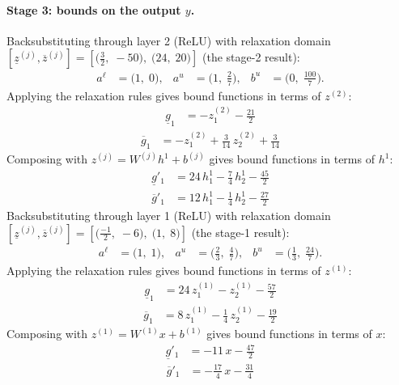 \documentclass[11pt]{article}
\begin{document}
\paragraph{Stage 3: bounds on the output $y$.}
Backsubstituting through layer 2 (ReLU) with relaxation domain $[\underline{z}^{(j)}, \overline{z}^{(j)}] = [\bigl(\frac{3}{2},\; -50\bigr),\; \bigl(24,\; 20\bigr)]$ (the stage-2 result):
\begin{align*}
a^{\ell} &= \bigl(1,\; 0\bigr), & a^{u} &= \bigl(1,\; \frac{2}{7}\bigr), & b^{u} &= \bigl(0,\; \frac{100}{7}\bigr).
\end{align*}
Applying the relaxation rules gives bound functions in terms of $z^{(2)}$:
\begin{align*}
\underline{g}_{1} &= -z^{(2)}_{1} - \frac{21}{2}
\end{align*}
\begin{align*}
\overline{g}_{1} &= -z^{(2)}_{1} + \frac{3}{14}\,z^{(2)}_{2} + \frac{3}{14}
\end{align*}
Composing with $z^{(j)} = W^{(j)} h^{1} + b^{(j)}$ gives bound functions in terms of $h^{1}$:
\begin{align*}
\underline{g}'_{1} &= 24\,h^{1}_{1} - \frac{7}{4}\,h^{1}_{2} - \frac{45}{2}
\end{align*}
\begin{align*}
\overline{g}'_{1} &= 12\,h^{1}_{1} - \frac{1}{4}\,h^{1}_{2} - \frac{27}{2}
\end{align*}
Backsubstituting through layer 1 (ReLU) with relaxation domain $[\underline{z}^{(j)}, \overline{z}^{(j)}] = [\bigl(\frac{-1}{2},\; -6\bigr),\; \bigl(1,\; 8\bigr)]$ (the stage-1 result):
\begin{align*}
a^{\ell} &= \bigl(1,\; 1\bigr), & a^{u} &= \bigl(\frac{2}{3},\; \frac{4}{7}\bigr), & b^{u} &= \bigl(\frac{1}{3},\; \frac{24}{7}\bigr).
\end{align*}
Applying the relaxation rules gives bound functions in terms of $z^{(1)}$:
\begin{align*}
\underline{g}_{1} &= 24\,z^{(1)}_{1} - z^{(1)}_{2} - \frac{57}{2}
\end{align*}
\begin{align*}
\overline{g}_{1} &= 8\,z^{(1)}_{1} - \frac{1}{4}\,z^{(1)}_{2} - \frac{19}{2}
\end{align*}
Composing with $z^{(1)} = W^{(1)} x + b^{(1)}$ gives bound functions in terms of $x$:
\begin{align*}
\underline{g}'_{1} &= -11\,x - \frac{47}{2}
\end{align*}
\begin{align*}
\overline{g}'_{1} &= -\frac{17}{4}\,x - \frac{31}{4}
\end{align*}
\end{document}
